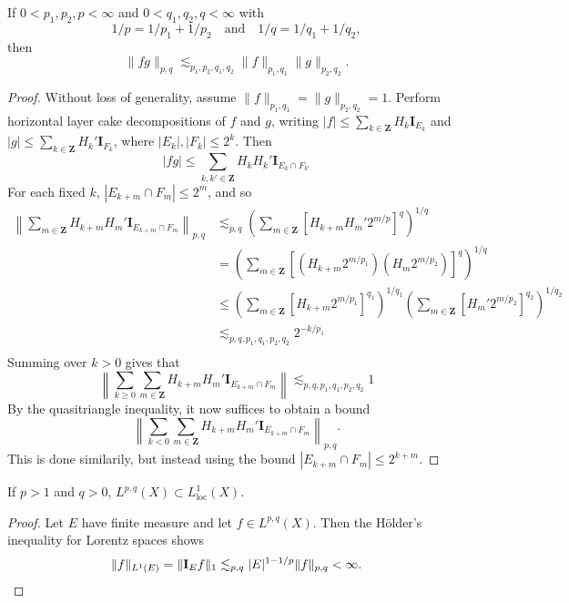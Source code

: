 \begin{theorem}
    If $0 < p_1,p_2,p < \infty$ and $0 < q_1,q_2,q < \infty$ with
    \[ 1/p = 1/p_1 + 1/p_2 \quad \text{and} \quad 1/q = 1/q_1 + 1/q_2, \]
    then
    \[ \| f g \|_{p,q} \lesssim_{p_1,p_2,q_1,q_2} \| f \|_{p_1,q_1} \| g \|_{p_2,q_2}. \]
\end{theorem}
\begin{proof}
    Without loss of generality, assume $\| f \|_{p_1,q_1} = \| g \|_{p_2, q_2} = 1$. Perform horizontal layer cake decompositions of $f$ and $g$, writing $|f| \leq \sum_{k \in \mathbf{Z}} H_k \mathbf{I}_{E_k}$ and $|g| \leq \sum_{k \in \mathbf{Z}} H_k' \mathbf{I}_{F_k}$, where $|E_k|, |F_k| \leq 2^k$. Then
    \[ |fg| \leq \sum_{k,k' \in \mathbf{Z}} H_k H_k' \mathbf{I}_{E_k \cap F_{k'}} \]
    For each fixed $k$, $|E_{k + m} \cap F_m| \leq 2^m$, and so
    \begin{align*}
        \left\| \sum_{m \in \mathbf{Z}} H_{k + m} H_m' \mathbf{I}_{E_{k+m} \cap F_m} \right\|_{p,q} &\lesssim_{p,q} \left( \sum_{m \in \mathbf{Z}} [H_{k+m} H_m' 2^{m/p}]^q \right)^{1/q}\\
        &= \left( \sum_{m \in \mathbf{Z}} \left[ (H_{k+m} 2^{m/p_1}) (H_m 2^{m/p_2}) \right]^q \right)^{1/q}\\
        &\leq \left( \sum_{m \in \mathbf{Z}} [H_{k+m} 2^{m/p_1} ]^{q_1} \right)^{1/q_1} \left( \sum_{m \in \mathbf{Z}} [H_m' 2^{m/p_2}]^{q_2} \right)^{1/q_2}\\
        &\lesssim_{p,q,p_1,q_1,p_2,q_2} 2^{-k/p_1}\\
    \end{align*}
    Summing over $k > 0$ gives that
    \[ \left\| \sum_{k \geq 0} \sum_{m \in \mathbf{Z}} H_{k+m} H_m' \mathbf{I}_{E_{k+m} \cap F_m} \right\| \lesssim_{p,q,p_1,q_1,p_2,q_2} 1 \]
    By the quasitriangle inequality, it now suffices to obtain a bound
    \[ \left\| \sum_{k < 0} \sum_{m \in \mathbf{Z}} H_{k+m} H_m' \mathbf{I}_{E_{k+m} \cap F_m} \right\|_{p,q}. \]
    This is done similarily, but instead using the bound $|E_{k+m} \cap F_m| \leq 2^{k+m}$.
\end{proof}

\begin{corollary}
    If $p > 1$ and $q > 0$, $L^{p,q}(X) \subset L^1_{\text{loc}}(X)$.
\end{corollary}
\begin{proof}
    Let $E$ have finite measure and let $f \in L^{p,q}(X)$. Then the H\"{o}lder's inequality for Lorentz spaces shows
    \[ \| f \|_{L^1(E)} = \| \mathbf{I}_E f \|_1 \lesssim_{p,q} |E|^{1 - 1/p} \| f \|_{p,q} < \infty. \qedhere \]
\end{proof}

